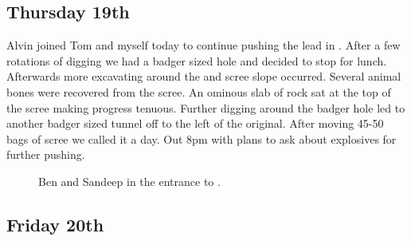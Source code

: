 \subsection{Thursday 19th}


Alvin joined Tom and myself today to continue pushing the lead in . After a few rotations of digging we had a badger sized hole and
decided to stop for lunch. Afterwards more excavating around the  and scree slope occurred. Several animal bones were recovered from
the scree. An ominous slab of rock sat at the top of the scree making
progress tenuous. Further digging around the badger hole led to another
badger sized tunnel off to the left of the original. After moving 45-50
bags of scree we called it a day. Out 8pm with plans to ask about
explosives for further pushing.

\begin{figure}[t!]
\checkoddpage \ifoddpage \forcerectofloat \else \forceversofloat \fi
{}
\caption{Ben and Sandeep in the entrance to \protect{}. }
\end{figure}

\subsection{Friday 20th}

